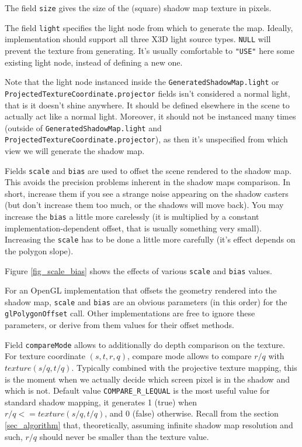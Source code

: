 \documentclass{acmsiggraph}                     %
\begin{document}
The field \texttt{size} gives the size of the (square) shadow map texture
in pixels.

The field \texttt{light} specifies the light node from which to generate the map.
Ideally, implementation should support all three X3D light source types.
\texttt{NULL} will prevent the texture from generating.
It's usually comfortable to \texttt{"USE"} here some existing light node,
instead of defining a new one.

Note that the light node instanced inside the \texttt{GeneratedShadowMap.light}
or \texttt{ProjectedTextureCoordinate.projector} fields isn't
considered a normal light, that is it doesn't shine anywhere.
It should be defined elsewhere in the scene to actually
act like a normal light. Moreover, it should not be
instanced many times (outside of \texttt{GeneratedShadowMap.light}
and \texttt{ProjectedTextureCoordinate.projector}), as then it's
unspecified from which view we will generate the shadow map.

Fields \texttt{scale} and \texttt{bias} are used
to offset the scene rendered to the shadow map.
This avoids the precision problems inherent in the shadow maps comparison.
In short, increase them if you see
a strange noise appearing on the shadow casters (but don't increase them too much,
or the shadows will move back).
You may increase the \texttt{bias} a little more
carelessly (it is multiplied by a constant implementation-dependent offset,
that is usually something very small).
Increasing the \texttt{scale} has to be done a little more carefully
(it's effect depends on the polygon slope).

Figure \ref{fig_scale_bias} shows the effects of various
\texttt{scale} and \texttt{bias} values.

For an OpenGL implementation
that offsets the geometry rendered into the shadow map,
\texttt{scale} and \texttt{bias} are an obvious parameters (in this order)
for the \texttt{glPolygonOffset} call.
Other implementations are free to ignore these parameters, or derive
from them values for their offset methods.

Field \texttt{compareMode} allows to additionally do depth comparison
on the texture. For texture coordinate $(s, t, r, q)$,
compare mode allows to compare $r/q$ with $texture(s/q, t/q)$.
Typically combined with the projective texture mapping, this is the moment when we
actually decide which screen pixel is in the shadow and which is not.
Default value \texttt{COMPARE\_R\_LEQUAL} is the most useful
value for standard shadow mapping, it generates 1 (true) when
$r/q <= texture(s/q, t/q)$, and 0 (false) otherwise. Recall from
the section \ref{sec_algorithm} that, theoretically, assuming infinite shadow map
resolution and such, $r/q$ should never be smaller than the texture value.
\end{document}
